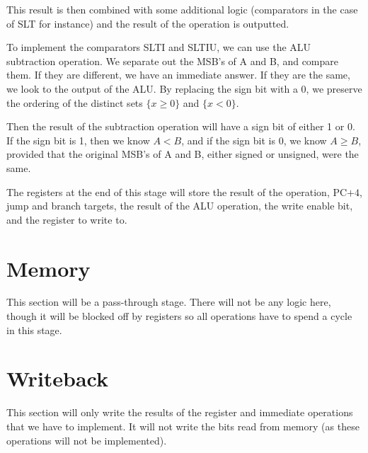 \documentclass{article}
\begin{document}
This result is then combined with some additional logic (comparators in the case of SLT for instance) and the result of the operation is outputted.

To implement the comparators SLTI and SLTIU, we can use the ALU subtraction operation. We separate out the MSB's of A and B, and compare them. If they are different, we have an immediate answer. If they are the same, we look to the output of the ALU. By replacing the sign bit with a 0, we preserve the ordering of the distinct sets $\{x \geq 0\}$ and $\{x < 0\}$. 

Then the result of the subtraction operation will have a sign bit of either 1 or 0. If the sign bit is 1, then we know $A < B$, and if the sign bit is 0, we know $A \geq B$, provided that the original MSB's of A and B, either signed or unsigned, were the same. 

The registers at the end of this stage will store the result of the operation, PC$+4$, jump and branch targets, the result of the ALU operation, the write enable bit, and the register to write to.

\section*{Memory}
This section will be a pass-through stage. There will not be any logic here, though it will be blocked off by registers so all operations have to spend a cycle in this stage.

\section*{Writeback}
This section will only write the results of the register and immediate operations that we have to implement.  It will not write the bits read from memory (as these operations will not be implemented).
\end{document}

